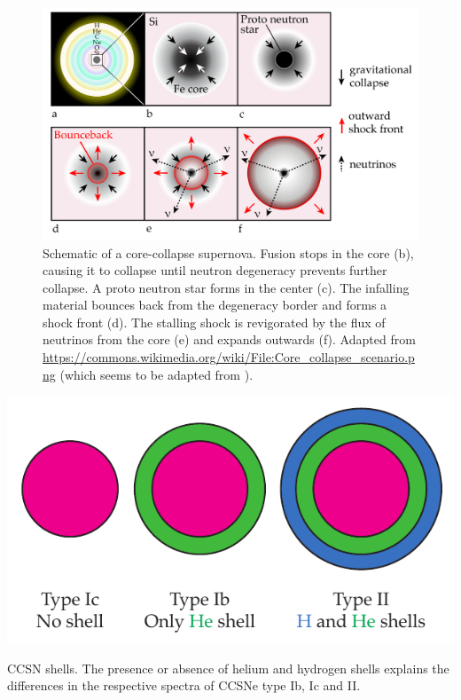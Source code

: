 \documentclass[
    a4paper, %
    fontsize=10pt, %
    twoside=false, %
    numbers=noenddot, %
    fontmethod=tex,
]{kaobook}
\begin{document}
\begin{figure}[htb]
    \includegraphics{theory/ccsn.pdf}
    \caption[Core-collapse supernova]{Schematic of a core-collapse supernova. Fusion stops in the core (b), causing it to collapse until neutron degeneracy prevents further collapse. A proto neutron star forms in the center (c). The infalling material bounces back from the degeneracy border and forms a shock front (d). The stalling shock is revigorated by the flux of neutrinos from the core (e) and expands outwards (f). Adapted from \url{https://commons.wikimedia.org/wiki/File:Core_collapse_scenario.png} (which seems to be adapted from \cite{Janka2012}).}
\end{figure}

\begin{marginfigure}
    \includegraphics{theory/sn_shells.pdf}
    \caption[CCSN shells]{CCSN shells. The presence or absence of helium and hydrogen shells explains the differences in the respective spectra of CCSNe type Ib, Ic and II.}
\end{marginfigure}
\end{document}
